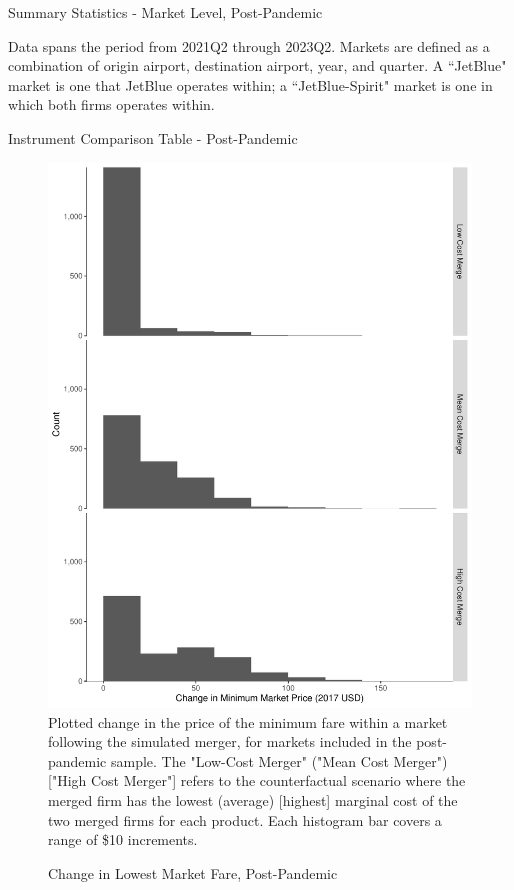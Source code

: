 \documentclass{article}
\begin{document}
\begin{appendices}
	\begin{table}
		\caption{Summary Statistics - Market Level, Post-Pandemic}
		\label{tab:SummaryStatistics_Market_Post}
		
		\footnotesize{Data spans the period from 2021Q2 through 2023Q2. Markets are defined as a combination of origin airport, destination airport, year, and quarter. A ``JetBlue" market is one that JetBlue operates within; a ``JetBlue-Spirit" market is one in which both firms operates within. }
	\end{table}
	
	\begin{landscape}
		\begin{table}
			\caption{Instrument Comparison Table - Post-Pandemic}
			\label{tab:Instrument_Compare}
			
		\end{table}
	\end{landscape}

	\begin{figure}
		\caption{Change in Lowest Market Fare, Post-Pandemic}
		\label{fig:LowestMarketChange_Post}
		\includegraphics[width = \linewidth]{Merger_Change_MinimumFare}
		\footnotesize{Plotted change in the price of the minimum fare within a market following the simulated merger, for markets included in the post-pandemic sample. The "Low-Cost Merger" ("Mean Cost Merger") ["High Cost Merger"] refers to the counterfactual scenario where the merged firm has the lowest (average) [highest] marginal cost of the two merged firms for each product. Each histogram bar covers a range of \$10 increments.}
	\end{figure}
	
	

	
\end{appendices}
	
\end{document}
